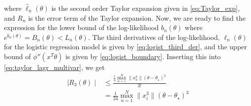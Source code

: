 where $\hat{\ell}_n\left(\theta\right)$ is the second order Taylor expansion given in \eqref{eq:Taylor_exp}, and $R_n$ is the error term of the Taylor expansion. Now, we are ready to find the expression for the lower bound of the log-likelihood $b_n\left(\theta\right)$ where $e^{b_n\left(\theta\right)} = B_n\left(\theta\right) < L_n\left(\theta\right)$. The third derivatives of the log-likelihood, $\ell_n\left(\theta\right)$ for the logistic regression model is given by \eqref{eq:logist_third_der}, and the upper bound of $\phi''\left(x^T \theta\right)$ is given by \eqref{eq:logist_boundary}. Inserting this into \eqref{eq:taylor_lagr_multivar}, we get
\begin{equation}
\begin{split}
    \mid R_3\left(\theta\right) \mid &\leq \frac{\frac{1}{4}\max_{n=1}^N \lVert x_n^3 \rVert \left(\theta - \theta_{\star}\right)^3}{3!} \\
    & = \frac{1}{24} \max_{n=1}^N \lVert x_i^3\rVert \left(\theta-\theta_{\star}\right)^3
    \end{split}
\end{equation}

